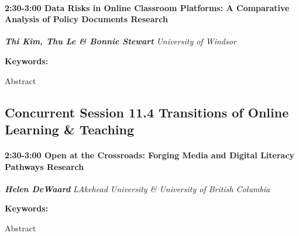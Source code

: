 \documentclass[
]{book}
\begin{document}
\begin{session}
\hypertarget{data-risks-in-online-classroom-platforms-a-comparative-analysis-of-policy-documents-research}{%
\paragraph*{\texorpdfstring{2:30-3:00 \textbar{} \textbf{Data Risks in
Online Classroom Platforms: A Comparative Analysis of Policy Documents}
\textbar{}
Research}{2:30-3:00 \textbar{} Data Risks in Online Classroom Platforms: A Comparative Analysis of Policy Documents \textbar{} Research}}\label{data-risks-in-online-classroom-platforms-a-comparative-analysis-of-policy-documents-research}}

\textbf{\emph{Thi Kim, Thu Le \& Bonnie Stewart}} \textbar{}
\emph{University of Windsor}

\textbf{Keywords:}

Abstract
\end{session}

\hypertarget{concurrent-session-11.4-transitions-of-online-learning-teaching}{%
\subsection*{Concurrent Session 11.4 \textbar{} Transitions of Online Learning \& Teaching}\label{concurrent-session-11.4-transitions-of-online-learning-teaching}}

\begin{session}
\hypertarget{open-at-the-crossroads-forging-media-and-digital-literacy-pathways-research}{%
\paragraph*{\texorpdfstring{2:30-3:00 \textbar{} \textbf{Open at the
Crossroads: Forging Media and Digital Literacy Pathways} \textbar{}
Research}{2:30-3:00 \textbar{} Open at the Crossroads: Forging Media and Digital Literacy Pathways \textbar{} Research}}\label{open-at-the-crossroads-forging-media-and-digital-literacy-pathways-research}}

\textbf{\emph{Helen DeWaard}} \textbar{} \emph{LAkehead University \&
University of British Columbia}

\textbf{Keywords:}

Abstract
\end{session}
\end{document}

